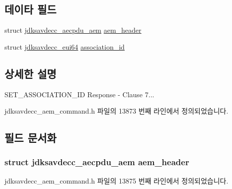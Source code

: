 \subsection*{데이타 필드}
\begin{DoxyCompactItemize}
\item 
struct \hyperlink{structjdksavdecc__aecpdu__aem}{jdksavdecc\+\_\+aecpdu\+\_\+aem} \hyperlink{structjdksavdecc__aem__command__set__association__id__response_ae1e77ccb75ff5021ad923221eab38294}{aem\+\_\+header}
\item 
struct \hyperlink{structjdksavdecc__eui64}{jdksavdecc\+\_\+eui64} \hyperlink{structjdksavdecc__aem__command__set__association__id__response_a0fa49c5118429af7a5ee7d71eada7b94}{association\+\_\+id}
\end{DoxyCompactItemize}


\subsection{상세한 설명}
S\+E\+T\+\_\+\+A\+S\+S\+O\+C\+I\+A\+T\+I\+O\+N\+\_\+\+ID Response -\/ Clause 7... 

jdksavdecc\+\_\+aem\+\_\+command.\+h 파일의 13873 번째 라인에서 정의되었습니다.



\subsection{필드 문서화}
\subsubsection[{\texorpdfstring{aem\+\_\+header}{aem_header}}]{\setlength{\rightskip}{0pt plus 5cm}struct {\bf jdksavdecc\+\_\+aecpdu\+\_\+aem} aem\+\_\+header}\hypertarget{structjdksavdecc__aem__command__set__association__id__response_ae1e77ccb75ff5021ad923221eab38294}{}\label{structjdksavdecc__aem__command__set__association__id__response_ae1e77ccb75ff5021ad923221eab38294}


jdksavdecc\+\_\+aem\+\_\+command.\+h 파일의 13875 번째 라인에서 정의되었습니다.

